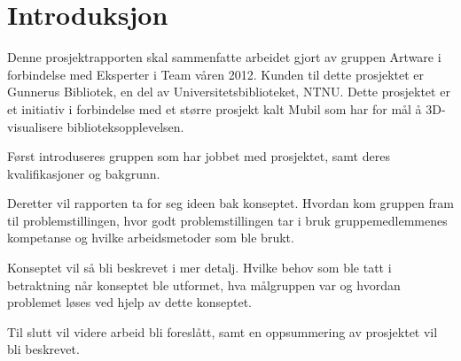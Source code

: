 \chapter{Introduksjon}
Denne prosjektrapporten skal sammenfatte arbeidet gjort av gruppen Artware i forbindelse med Eksperter i Team våren 2012. Kunden til dette prosjektet er Gunnerus Bibliotek, en del av Universitetsbiblioteket, NTNU. Dette prosjektet er et initiativ i forbindelse med et større prosjekt kalt Mubil\cite{mubil} som har for mål å 3D-visualisere biblioteksopplevelsen. 

Først introduseres gruppen som har jobbet med prosjektet, samt deres kvalifikasjoner og bakgrunn. 

Deretter vil rapporten ta for seg ideen bak konseptet. Hvordan kom gruppen fram til problemstillingen, hvor godt problemstillingen tar i bruk gruppemedlemmenes kompetanse og hvilke arbeidsmetoder som ble brukt.

Konseptet vil så bli beskrevet i mer detalj. Hvilke behov som ble tatt i betraktning når konseptet ble utformet, hva målgruppen var og hvordan problemet løses ved hjelp av dette konseptet. 

Til slutt vil videre arbeid bli foreslått, samt en oppsummering av prosjektet vil bli beskrevet. 